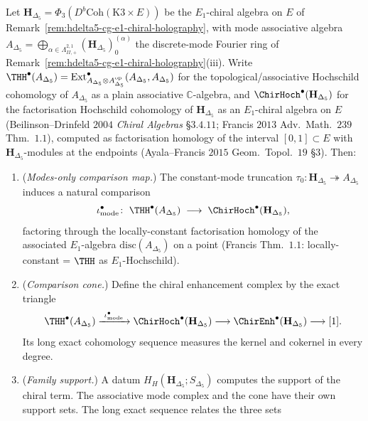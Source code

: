 \begin{proposition}
\label{prop:hochcalc-chirhoch-vs-thh-hdelta5-structural-gap}
Let $\mathbf H_{\Delta_5}=\Phi_3(D^b\mathrm{Coh}(\mathrm{K3}\times E))$ be
the $E_1$-chiral algebra on $E$ of
Remark~\ref{rem:hdelta5-cg-e1-chiral-holography}, with mode
associative algebra $A_{\Delta_5}=\bigoplus_{\alpha\in\Lambda^{2,1}_{II,+}}(\mathbf H_{\Delta_5})^{(\alpha)}_{0}$
the discrete-mode Fourier ring of
Remark~\ref{rem:hdelta5-cg-e1-chiral-holography}(iii). Write
$\THH^\bullet(A_{\Delta_5})=\mathrm{Ext}^\bullet_{A_{\Delta_5}\otimes A_{\Delta_5}^{\mathrm{op}}}(A_{\Delta_5},A_{\Delta_5})$
for the topological/associative Hochschild cohomology of
$A_{\Delta_5}$ as a plain associative $\mathbb C$-algebra, and
$\ChirHoch^\bullet(\mathbf H_{\Delta_5})$ for the factorisation
Hochschild cohomology of $\mathbf H_{\Delta_5}$ as an $E_1$-chiral
algebra on $E$ (Beilinson--Drinfeld $2004$ \emph{Chiral Algebras}
\S$3.4.11$; Francis $2013$ Adv.\ Math.\ $239$ Thm.\ $1.1$), computed as
factorisation homology of the interval $[0,1]\subset E$ with
$\mathbf H_{\Delta_5}$-modules at the endpoints (Ayala--Francis $2015$
Geom.\ Topol.\ $19$ \S$3$). Then:
\begin{enumerate}[label=(\roman*),leftmargin=1.5em]
 \item (\emph{Modes-only comparison map.}) The constant-mode
 truncation $\tau_0:\mathbf H_{\Delta_5}\twoheadrightarrow A_{\Delta_5}$
 induces a natural comparison
 \[
 \iota^\bullet_{\mathrm{mode}}\colon\; \THH^\bullet(A_{\Delta_5})
 \;\longrightarrow\; \ChirHoch^\bullet(\mathbf H_{\Delta_5}),
 \]
 factoring through the locally-constant factorisation homology of the
 associated $E_1$-algebra $\mathrm{disc}(A_{\Delta_5})$ on a point
 (Francis Thm.\ $1.1$: locally-constant = $\THH$ as $E_1$-Hochschild).
 \item (\emph{Comparison cone.}) Define the chiral enhancement complex
 by the exact triangle
 \[
 \THH^\bullet(A_{\Delta_5})
 \xrightarrow{\ \iota^\bullet_{\mathrm{mode}}\ }
 \ChirHoch^\bullet(\mathbf H_{\Delta_5})
 \longrightarrow
 \ChirEnh^\bullet(\mathbf H_{\Delta_5})
 \longrightarrow[1].
 \]
 Its long exact cohomology sequence measures the kernel and cokernel in
 every degree.
 \item (\emph{Family support.})  A datum
 $H_H(\mathbf H_{\Delta_5};S_{\Delta_5})$ computes the support of the
 chiral term.  The associative mode complex and the cone have their
 own support sets.  The long exact sequence relates the three sets

\end{enumerate}
\end{proposition}
